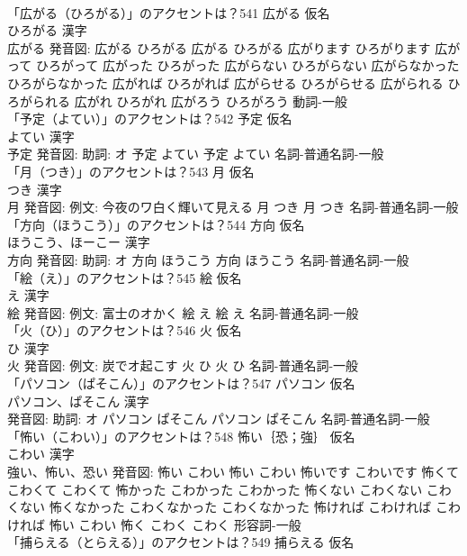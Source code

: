 \documentclass[8pt]{extreport}
\begin{document}
\begin{CJK}{UTF8}{min}
\\	「広がる（ひろがる）」のアクセントは？541	広がる 仮名　
\\	ひろがる 漢字　
\\	広がる 発音図:	広がる ひろがる		広がる ひろがる 広がります ひろがります 広がって ひろがって 広がった ひろがった 広がらない ひろがらない 広がらなかった ひろがらなかった 広がれば ひろがれば 広がらせる ひろがらせる 広がられる ひろがられる 広がれ ひろがれ 広がろう ひろがろう				動詞-一般 
\\	「予定（よてい）」のアクセントは？542	予定 仮名　
\\	よてい 漢字　
\\	予定 発音図: 助詞: オ	予定 よてい		予定 よてい				名詞-普通名詞-一般 
\\	「月（つき）」のアクセントは？543	月 仮名　
\\	つき 漢字　
\\	月 発音図: 例文: 今夜のワ白く輝いて見える	月 つき		月 つき				名詞-普通名詞-一般 
\\	「方向（ほうこう）」のアクセントは？544	方向 仮名　
\\	ほうこう、ほーこー 漢字　
\\	方向 発音図: 助詞: オ	方向 ほうこう		方向 ほうこう				名詞-普通名詞-一般 
\\	「絵（え）」のアクセントは？545	絵 仮名　
\\	え 漢字　
\\	絵 発音図: 例文: 富士のオかく	絵 え		絵 え				名詞-普通名詞-一般 
\\	「火（ひ）」のアクセントは？546	火 仮名　
\\	ひ 漢字　
\\	火 発音図: 例文: 炭でオ起こす	火 ひ		火 ひ				名詞-普通名詞-一般 
\\	「パソコン（ぱそこん）」のアクセントは？547	パソコン 仮名　
\\	パソコン、ぱそこん 漢字　
\\	発音図: 助詞: オ	パソコン ぱそこん		パソコン ぱそこん				名詞-普通名詞-一般 
\\	「怖い（こわい）」のアクセントは？548	怖い｛恐；強｝ 仮名　
\\	こわい 漢字　
\\	強い、怖い、恐い 発音図:	怖い こわい		怖い こわい 怖いです こわいです 怖くて こわくて こわくて 怖かった こわかった こわかった 怖くない こわくない こわくない 怖くなかった こわくなかった こわくなかった 怖ければ こわければ こわければ 怖い こわい 怖く こわく こわく				形容詞-一般 
\\	「捕らえる（とらえる）」のアクセントは？549	捕らえる 仮名　

\end{CJK}
\end{document}
